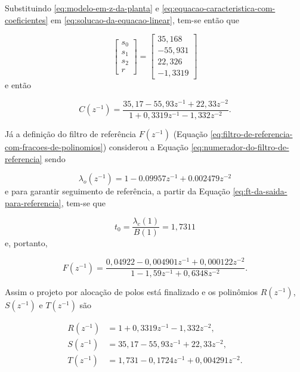 Substituindo \ref{eq:modelo-em-z-da-planta} e
\ref{eq:equacao-caracteristica-com-coeficientes} em
\ref{eq:solucao-da-equacao-linear}, tem-se então que

\begin{equation}
    \label{eq:coeficientes-do-controlador}
    \begin{bmatrix}
        s_0 \\ 
        s_1 \\ 
        s_2 \\ 
        r
    \end{bmatrix}
        =
    \begin{bmatrix}
        35,168 \\ 
        -55,931 \\ 
        22,326 \\ 
        -1,3319
    \end{bmatrix}
\end{equation} e então

\begin{equation}
    \label{eq:controlador-discreto}
    C(z^{-1}) = \frac{35,17-55,93z^{-1}+22,33z^{-2}}{1+0,3319z^{-1}-1,332z^{-2}}.
\end{equation}

Já a definição do filtro de referência $F(z^{-1})$ (Equação
\ref{eq:filtro-de-referencia-com-fracoes-de-polinomios}) considerou a Equação
\ref{eq:numerador-do-filtro-de-referencia} sendo

\begin{equation}
    \label{eq:definicao-dos-polos-0bservaveis}
    \lambda_o(z^{-1}) = 1 - 0.09957 z^{-1} + 0.002479 z^{-2}
\end{equation} e para garantir seguimento de referência, a partir da Equação
\ref{eq:ft-da-saida-para-referencia}, tem-se que

\begin{equation}
    \label{eq:ganho-do-filtro-de-referencia}
    t_0 = \frac{\lambda_c(1)}{B(1)} = 1,7311
\end{equation} e, portanto,

\begin{equation}
    F(z^{-1}) = \frac{0,04922-0,004901z^{-1}+0,000122z^{-2}}{1-1,59z^{-1}+0,6348z^{-2}}.
\end{equation}

Assim o projeto por alocação de polos está finalizado e os polinômios
$R(z^{-1})$, $S(z^{-1})$ e $T(z^{-1})$ são

\begin{equation}
    \label{eq:polinomios-rst}
    \begin{split}
        R(z^{-1}) &= 1+0,3319z^{-1}-1,332z^{-2}, \\
        S(z^{-1}) &= 35,17-55,93z^{-1}+22,33z^{-2}, \\
        T(z^{-1}) &= 1,731-0,1724z^{-1}+0,004291z^{-2}.
    \end{split}
\end{equation}